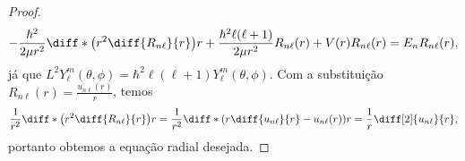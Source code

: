 \begin{proof}
    \begin{equation*}
        -\frac{\hbar^2}{2\mu r^2}\diff*{\left(r^2 \diff{R_{n\ell}}{r}\right)}{r} + \frac{\hbar^2\ell(\ell + 1)}{2\mu r^2}R_{n\ell}(r) + V(r) R_{n\ell}(r) = E_n R_{n\ell}(r),
    \end{equation*}
    já que \(L^2Y_\ell^m(\theta,\phi) = \hbar^2 \ell (\ell + 1) Y_{\ell}^m(\theta, \phi)\). Com a substituição \(R_{n\ell}(r) = \frac{u_{n\ell}(r)}{r}\), temos
    \begin{equation*}
        \frac{1}{r^2}\diff*{\left(r^2 \diff{R_{n\ell}}{r}\right)}{r} = \frac{1}{r^2} \diff*{\left(r \diff{u_{n\ell}}{r} - u_{n\ell}(r)\right)}{r} = \frac{1}{r}\diff[2]{u_{n\ell}}{r},
    \end{equation*}
    portanto obtemos a equação radial desejada.
\end{proof}

